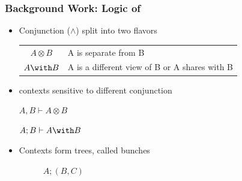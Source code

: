 \begin{frame}[c]
  \frametitle{Background Work: Logic of \BI{}}
  \begin{center}
    \begin{itemize}

    \item<1-> Conjunction ($\wedge$) split into two flavors
      \begin{center}
      \begin{tabular}[c]{c l}
      $A \otimes B$& A is separate from B\\
      $A \with B$&  A is a different view of B or A shares with B
      \end{tabular}
    \end{center}
    \item<2-> \BI{} contexts sensitive to different conjunction
      \begin{center}
        \begin{minipage}[h]{0.5\linewidth}
          $A, B \vdash A \otimes B$
        \end{minipage}%
        \begin{minipage}[h]{0.5\linewidth}
          $A; B \vdash A \with B$
        \end{minipage}
    \end{center}
    \item<3-> Contexts form trees, called bunches
      \begin{center}
        \begin{figure}[h]\centering
      \begin{minipage}{0.5\linewidth}\centering
        \caption*{$(A;B),C$}
      \end{minipage}%
      \begin{minipage}{0.5\linewidth}\centering
        \caption*{$A;(B,C)$}
      \end{minipage}
    \end{figure}

    \end{center}

\end{itemize}
\end{center}
\end{frame}

